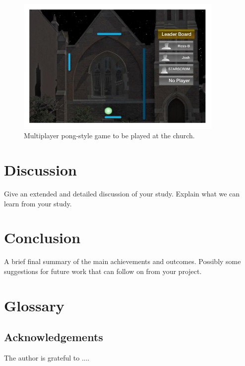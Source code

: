 \documentclass[a4paper,12pt]{article}
\begin{document}
\begin{figure}[ht!]
	\centering
	\includegraphics[width=100mm]{./images/MultiPlayerChurchGame}
	\caption{Multiplayer pong-style game to be played at the church.}
	\label{application-multiPlyerPong}
\end{figure}

\newpage
\section{Discussion}
%
Give an extended and detailed discussion of your study. Explain what we can learn from your study.
%

\section{Conclusion}
%
A brief final summary of the main achievements and outcomes. Possibly some suggestions for future work that can follow on from your project.%

\section{Glossary}
%
\subsection*{Acknowledgements}
The author is grateful to ....
%
\vskip 0.2in
\newpage


\end{document}
